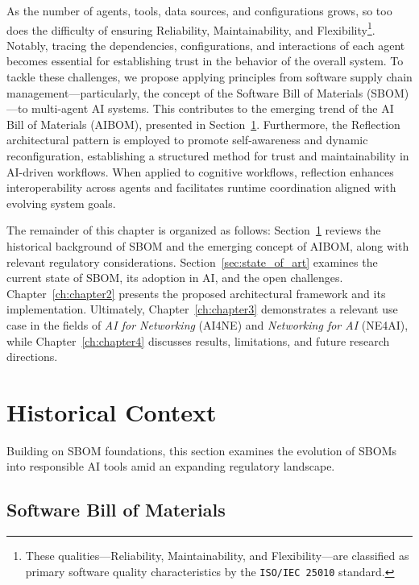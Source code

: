 As the number of agents, tools, data sources, and configurations grows, so too does the difficulty of ensuring Reliability, Maintainability, and Flexibility\footnote{These qualities—Reliability, Maintainability, and Flexibility—are classified as primary software quality characteristics by the \texttt{ISO/IEC 25010} standard.}. Notably, tracing the dependencies, configurations, and interactions of each agent becomes essential for establishing trust in the behavior of the overall system. To tackle these challenges, we propose applying principles from software supply chain management—particularly, the concept of the Software Bill of Materials (SBOM)—to multi-agent AI systems. This contributes to the emerging trend of the AI Bill of Materials (AIBOM), presented in Section~\ref{sec:historical_context}. Furthermore, the Reflection architectural pattern is employed to promote self-awareness and dynamic reconfiguration, establishing a structured method for trust and maintainability in AI-driven workflows. When applied to cognitive workflows, reflection enhances interoperability across agents and facilitates runtime coordination aligned with evolving system goals. 

The remainder of this chapter is organized as follows: Section~\ref{sec:historical_context} reviews the historical background of SBOM and the emerging concept of AIBOM, along with relevant regulatory considerations. Section~\ref{sec:state_of_art} examines the current state of SBOM, its adoption in AI, and the open challenges. Chapter~\ref{ch:chapter2} presents the proposed architectural framework and its implementation. Ultimately, Chapter~\ref{ch:chapter3} demonstrates a relevant use case in the fields of \textit{AI for Networking} (AI4NE) and \textit{Networking for AI} (NE4AI), while Chapter~\ref{ch:chapter4} discusses results, limitations, and future research directions.




\section{Historical Context} \label{sec:historical_context}
Building on SBOM foundations, this section examines the evolution of SBOMs into responsible AI tools amid an expanding regulatory landscape.

\subsection{Software Bill of Materials}

